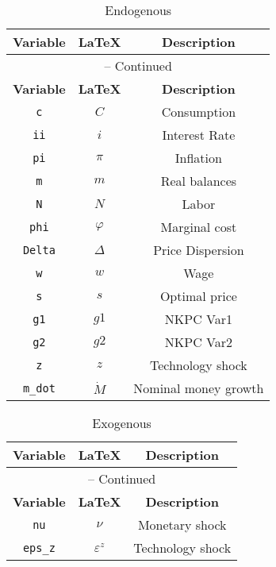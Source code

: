 \begin{center}
\begin{longtable}{ccc}
\caption{Endogenous}\\%
\hline%
\multicolumn{1}{c}{\textbf{Variable}} &
\multicolumn{1}{c}{\textbf{\LaTeX}} &
\multicolumn{1}{c}{\textbf{Description}}\\%
\hline\hline%
\endfirsthead
\multicolumn{3}{c}{{\tablename} \thetable{} -- Continued}\\%
\hline%
\multicolumn{1}{c}{\textbf{Variable}} &
\multicolumn{1}{c}{\textbf{\LaTeX}} &
\multicolumn{1}{c}{\textbf{Description}}\\%
\hline\hline%
\endhead
\texttt{c} & $C$ & Consumption\\
\texttt{ii} & $i$ & Interest Rate\\
\texttt{pi} & $\pi$ & Inflation\\
\texttt{m} & $m$ & Real balances\\
\texttt{N} & $N$ & Labor\\
\texttt{phi} & $\varphi$ & Marginal cost\\
\texttt{Delta} & $\Delta$ & Price Dispersion\\
\texttt{w} & $w$ & Wage\\
\texttt{s} & $s$ & Optimal price\\
\texttt{g1} & $g1$ & NKPC Var1\\
\texttt{g2} & $g2$ & NKPC Var2\\
\texttt{z} & $z$ & Technology shock\\
\texttt{m\_dot} & $\dot{M}$ & Nominal money growth\\
\hline%
\end{longtable}
\end{center}
\begin{center}
\begin{longtable}{ccc}
\caption{Exogenous}\\%
\hline%
\multicolumn{1}{c}{\textbf{Variable}} &
\multicolumn{1}{c}{\textbf{\LaTeX}} &
\multicolumn{1}{c}{\textbf{Description}}\\%
\hline\hline%
\endfirsthead
\multicolumn{3}{c}{{\tablename} \thetable{} -- Continued}\\%
\hline%
\multicolumn{1}{c}{\textbf{Variable}} &
\multicolumn{1}{c}{\textbf{\LaTeX}} &
\multicolumn{1}{c}{\textbf{Description}}\\%
\hline\hline%
\endhead
\texttt{nu} & $\nu$ & Monetary shock\\
\texttt{eps\_z} & $\varepsilon^{z}$ & Technology shock\\
\hline%
\end{longtable}
\end{center}
